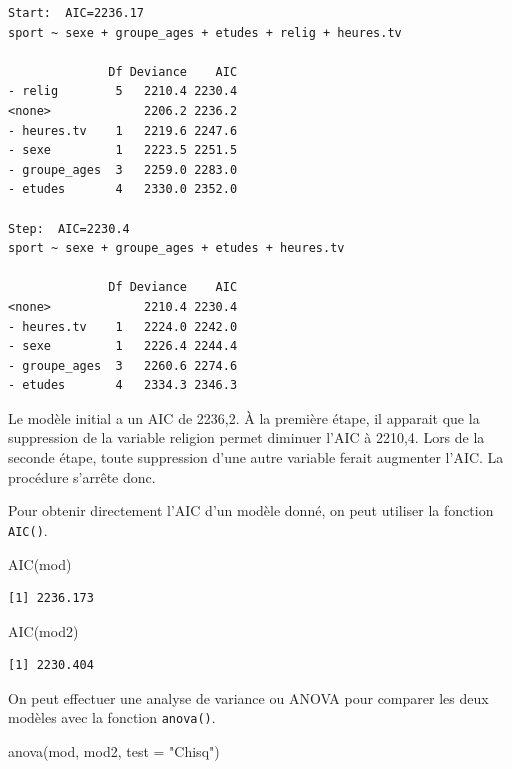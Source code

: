\documentclass[
  letterpaper,
  DIV=11,
  numbers=noendperiod,
  oneside]{scrreprt}
\newenvironment{Shaded}{\begin{snugshade}}{\end{snugshade}}
\newcommand{\AttributeTok}[1]{\textcolor[rgb]{0.40,0.45,0.13}{#1}}
\newcommand{\FunctionTok}[1]{\textcolor[rgb]{0.28,0.35,0.67}{#1}}
\newcommand{\NormalTok}[1]{\textcolor[rgb]{0.00,0.23,0.31}{#1}}
\newcommand{\StringTok}[1]{\textcolor[rgb]{0.13,0.47,0.30}{#1}}
\begin{document}
\begin{verbatim}
Start:  AIC=2236.17
sport ~ sexe + groupe_ages + etudes + relig + heures.tv

              Df Deviance    AIC
- relig        5   2210.4 2230.4
<none>             2206.2 2236.2
- heures.tv    1   2219.6 2247.6
- sexe         1   2223.5 2251.5
- groupe_ages  3   2259.0 2283.0
- etudes       4   2330.0 2352.0

Step:  AIC=2230.4
sport ~ sexe + groupe_ages + etudes + heures.tv

              Df Deviance    AIC
<none>             2210.4 2230.4
- heures.tv    1   2224.0 2242.0
- sexe         1   2226.4 2244.4
- groupe_ages  3   2260.6 2274.6
- etudes       4   2334.3 2346.3
\end{verbatim}

Le modèle initial a un AIC de 2236,2. À la première étape, il apparait
que la suppression de la variable religion permet diminuer l'AIC à
2210,4. Lors de la seconde étape, toute suppression d'une autre variable
ferait augmenter l'AIC. La procédure s'arrête donc.

Pour obtenir directement l'AIC d'un modèle donné, on peut utiliser la
fonction \texttt{AIC()}.

\begin{Shaded}
\begin{Highlighting}[]
\FunctionTok{AIC}\NormalTok{(mod)}
\end{Highlighting}
\end{Shaded}

\begin{verbatim}
[1] 2236.173
\end{verbatim}

\begin{Shaded}
\begin{Highlighting}[]
\FunctionTok{AIC}\NormalTok{(mod2)}
\end{Highlighting}
\end{Shaded}

\begin{verbatim}
[1] 2230.404
\end{verbatim}

On peut effectuer une analyse de variance ou ANOVA pour comparer les
deux modèles avec la fonction \texttt{anova()}.

\begin{Shaded}
\begin{Highlighting}[]
\FunctionTok{anova}\NormalTok{(mod, mod2, }\AttributeTok{test =} \StringTok{"Chisq"}\NormalTok{)}
\end{Highlighting}
\end{Shaded}
\end{document}

